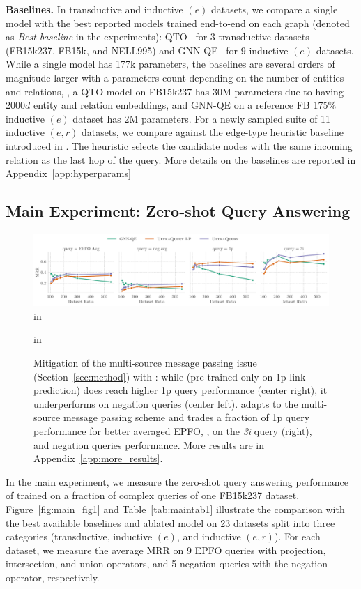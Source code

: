 \textbf{Baselines.}
In transductive and inductive $(e)$ datasets, we compare a single \method model with the best reported models trained end-to-end on each graph (denoted as \emph{Best baseline} in the experiments): QTO~\citep{qto} for 3 transductive datasets (FB15k237, FB15k, and NELL995) and GNN-QE~\citep{galkin2022} for 9 inductive $(e)$ datasets.
While a single \method model has 177k parameters, the baselines are several orders of magnitude larger with a parameters count depending on the number of entities and relations, \eg, a QTO model on FB15k237 has 30M parameters due to having 2000$d$ entity and relation embeddings, and GNN-QE on a reference FB 175\% inductive $(e)$ dataset has 2M parameters.
For a newly sampled suite of 11 inductive $(e, r)$ datasets, we compare against the edge-type heuristic baseline introduced in \citet{galkin2022}. 
The heuristic selects the candidate nodes with the same incoming relation as the last hop of the query. 
More details on the baselines are reported in Appendix~\ref{app:hyperparams}

\subsection{Main Experiment: Zero-shot Query Answering}


\begin{figure}[t]
    \centering
    \includegraphics[width=\linewidth]{figs/newres_pyg.pdf}
     in
    \caption{Mitigation of the multi-source message passing issue (Section~\ref{sec:method}) with \method: while \methodlp (pre-trained only on 1p link prediction) does reach higher 1p query performance (center right), it underperforms on negation queries (center left). \method adapts to the multi-source message passing scheme and trades a fraction of 1p query performance for better averaged EPFO, \eg, on the \emph{3i} query (right), and negation queries performance. More results are in Appendix~\ref{app:more_results}.}
    \label{fig:abl_multisource}
     in
\end{figure}

In the main experiment, we measure the zero-shot query answering performance of \method trained on a fraction of complex queries of one FB15k237 dataset. 
Figure~\ref{fig:main_fig1} and Table~\ref{tab:maintab1} illustrate the comparison with the best available baselines and ablated \methodlp model on 23 datasets split into three categories (transductive, inductive $(e)$, and inductive $(e,r)$). 
For each dataset, we measure the average MRR on 9 EPFO queries with projection, intersection, and union operators, and 5 negation queries with the negation operator, respectively.

